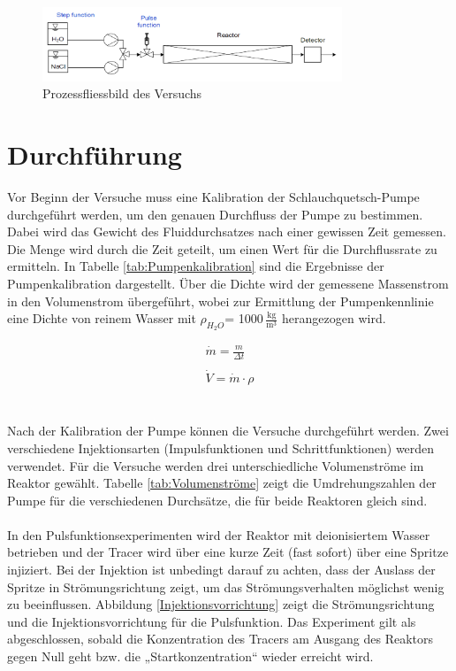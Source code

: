\documentclass[12pt,liststotoc]{report}
\begin{document}
\begin{figure}[H]
\centering
\includegraphics[width=0.8\textwidth]{Graphics/Prozessfliessbild.png} 
\caption[Prozessfliessbild des Versuchs]{Prozessfliessbild des Versuchs \cite{Skript_2018}}
\label{Prozessfliessbild}
\end{figure}
\noindent






\chapter{Durchführung}



Vor Beginn der Versuche muss eine Kalibration der Schlauchquetsch-Pumpe durchgeführt werden, um den genauen Durchfluss der Pumpe zu bestimmen. Dabei wird das Gewicht des Fluiddurchsatzes nach einer gewissen Zeit gemessen. Die Menge wird durch die Zeit geteilt, um einen Wert für die Durchflussrate zu ermitteln. In Tabelle \ref{tab:Pumpenkalibration} sind die Ergebnisse der Pumpenkalibration dargestellt. Über die Dichte wird der gemessene Massenstrom in den Volumenstrom übergeführt, wobei zur Ermittlung der Pumpenkennlinie eine Dichte von reinem Wasser mit $\rho_{H_2O}$= 1000\,$\frac{\text{kg}}{\text{m}^3}$ herangezogen wird.

\begin{gather*}
\dot{m} = \frac{m}{\Delta t} \\
\\
\dot{V} = \dot{m} \cdot \rho
\end{gather*}
\\
\\
Nach der Kalibration der Pumpe können die Versuche durchgeführt werden. Zwei verschiedene Injektionsarten (Impulsfunktionen und Schrittfunktionen) werden verwendet. Für die Versuche werden drei unterschiedliche Volumenströme im Reaktor gewählt. Tabelle \ref{tab:Volumenströme} zeigt die Umdrehungszahlen der Pumpe für die verschiedenen Durchsätze, die für beide Reaktoren gleich sind.
\\
\\
In den Pulsfunktionsexperimenten wird der Reaktor mit deionisiertem Wasser betrieben und der Tracer wird über eine kurze Zeit (fast sofort) über eine Spritze injiziert. Bei der Injektion ist unbedingt darauf zu achten, dass der Auslass der Spritze in Strömungsrichtung zeigt, um das Strömungsverhalten möglichst wenig zu beeinflussen. Abbildung \ref{Injektionsvorrichtung} zeigt die Strömungsrichtung und die Injektionsvorrichtung für die Pulsfunktion. Das Experiment gilt als abgeschlossen, sobald die Konzentration des Tracers am Ausgang des Reaktors gegen Null geht bzw. die „Startkonzentration“ wieder erreicht wird.
\end{document}
